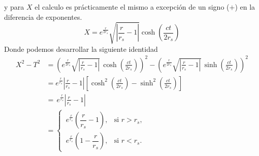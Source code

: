 y para $X$ el calculo es prácticamente el mismo a excepción de un signo ($+$) en la diferencia de exponentes.
\begin{equation}
        X  = e^{\frac{r}{2 r_s}} \sqrt{\left|\frac{r}{r_s}-1\right|}  \cosh\left(\frac{ct}{2r_s}\right)
        \label{eq:Kruskal-SzekeresX(r,t)}
\end{equation}
Donde podemos desarrollar la siguiente identidad
\begin{equation}
    \begin{aligned}
         X^2 -T^2  &=  \left( e^{\frac{r}{2r_s}} \sqrt{\left|\frac{r}{r_s}-1\right|}\, \cosh\left(\frac{ct}{2r_s}\right) \right)^2- \left( e^{\frac{r}{2r_s}} \sqrt{\left|\frac{r}{r_s}-1\right|}\, \sinh\left(\frac{ct}{2r_s}\right) \right)^2 \\[1mm]
        &= e^{\frac{r}{r_s}} \left|\frac{r}{r_s}-1\right| \left[ \cosh^2\left(\frac{ct}{2r_s}\right) -\sinh^2\left(\frac{ct}{2r_s}\right) \right]\\[1mm]
        &= \, e^{\frac{r}{r_s}} \left|\frac{r}{r_s}-1\right|\\[2mm]
        &=
        \begin{cases}
            \, e^{\frac{r}{r_s}} \left(\dfrac{r}{r_s}-1\right), & \text{si } r > r_s,\\[2mm]
            \, e^{\frac{r}{r_s}} \left(1-\dfrac{r}{r_s}\right), & \text{si } r < r_s.
        \end{cases}
    \end{aligned}
    \label{eq:Kruskal-SzekeresT^2-X^2}
\end{equation}

